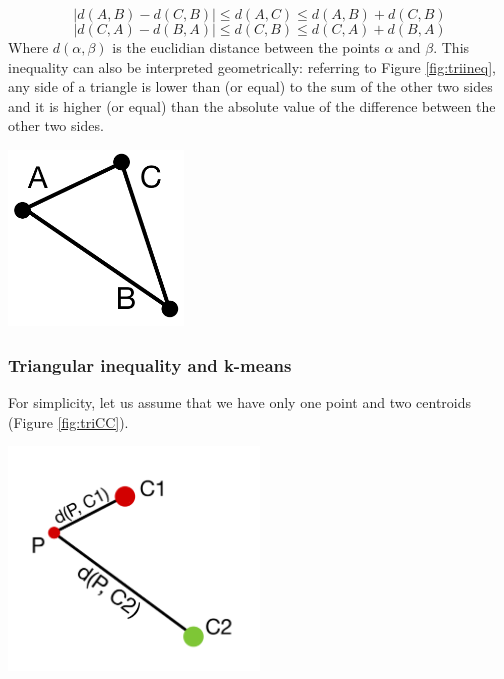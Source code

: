 \documentclass{report}
\begin{document}
\begin{minipage}[b]{0.48\textwidth}
    \begin{equation}
        |d(A, B) - d(C, B)| \leq d(A, C) \leq d(A, B) + d(C, B)
        \end{equation}
        \begin{equation}
        |d(C, A) - d(B, A)| \leq d(C, B) \leq d(C, A) + d(B, A)
        \end{equation}
        Where $d(\alpha, \beta)$ is the euclidian distance between the points $\alpha$ and $\beta$. This inequality can also be interpreted geometrically: referring to Figure \ref{fig:triineq}, any side of a triangle is lower than (or equal) to the sum of the other two sides and it is higher (or equal) than the absolute value of the difference between the other two sides.

        \hspace{0.1in}
        \begin{center}
        \includegraphics[width = 0.35\textwidth]{imgs/triangle.png}
        \label{fig:triineq}
        \end{center}

        \subsubsection*{Triangular inequality and k-means}
        For simplicity, let us assume that we have only one point and two centroids (Figure \ref{fig:triCC}).  

        \begin{center}
            \includegraphics[width = 0.5\textwidth]{imgs/triCC.png}
            \label{fig:triCC}
        \end{center}


\end{minipage}
\end{document}
